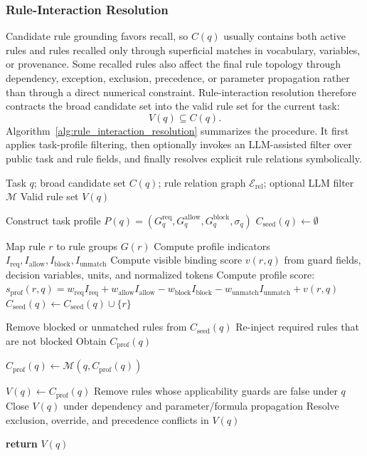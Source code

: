 ﻿\documentclass[a4paper,fleqn]{cas-dc}
\begin{document}
\subsubsection{Rule-Interaction Resolution}
\label{sec:rule_interaction_resolution}

Candidate rule grounding favors recall, so $C(q)$ usually contains both active rules and rules recalled only through superficial matches in vocabulary, variables, or provenance. Some recalled rules also affect the final rule topology through dependency, exception, exclusion, precedence, or parameter propagation rather than through a direct numerical constraint. Rule-interaction resolution therefore contracts the broad candidate set into the valid rule set for the current task:
\begin{equation}
V(q) \subseteq C(q).
\end{equation}
Algorithm~\ref{alg:rule_interaction_resolution} summarizes the procedure. It first applies task-profile filtering, then optionally invokes an LLM-assisted filter over public task and rule fields, and finally resolves explicit rule relations symbolically.

\begin{algorithm}[t]
\caption{Rule-Interaction Resolution}
\label{alg:rule_interaction_resolution}
\begin{algorithmic}[1]
\Require Task $q$; broad candidate set $C(q)$; rule relation graph $\mathcal{E}_{\mathrm{rel}}$; optional LLM filter $\mathcal{M}$
\Ensure Valid rule set $V(q)$

\State Construct task profile $P(q) = (G_q^{\mathrm{req}}, G_q^{\mathrm{allow}}, G_q^{\mathrm{block}}, \sigma_q)$
\State $C_{\mathrm{seed}}(q) \leftarrow \emptyset$

    \State Map rule $r$ to rule groups $G(r)$
    \State Compute profile indicators $I_{\mathrm{req}}, I_{\mathrm{allow}}, I_{\mathrm{block}}, I_{\mathrm{unmatch}}$
    \State Compute visible binding score $v(r,q)$ from guard fields, decision variables, units, and normalized tokens
    \State Compute profile score: $s_{\mathrm{prof}}(r,q) = w_{\mathrm{req}}I_{\mathrm{req}} + w_{\mathrm{allow}}I_{\mathrm{allow}} - w_{\mathrm{block}}I_{\mathrm{block}} - w_{\mathrm{unmatch}}I_{\mathrm{unmatch}} + v(r,q)$
        \State $C_{\mathrm{seed}}(q) \leftarrow C_{\mathrm{seed}}(q) \cup \{r\}$
    \EndIf
\EndFor

\State Remove blocked or unmatched rules from $C_{\mathrm{seed}}(q)$
\State Re-inject required rules that are not blocked
\State Obtain $C_{\mathrm{prof}}(q)$

    \State $C_{\mathrm{prof}}(q) \leftarrow \mathcal{M}(q, C_{\mathrm{prof}}(q))$
\EndIf

\State $V(q) \leftarrow C_{\mathrm{prof}}(q)$
\State Remove rules whose applicability guards are false under $q$
\State Close $V(q)$ under dependency and parameter/formula propagation
\State Resolve exclusion, override, and precedence conflicts in $V(q)$

\State \textbf{return} $V(q)$
\end{algorithmic}
\end{algorithm}
\end{document}
